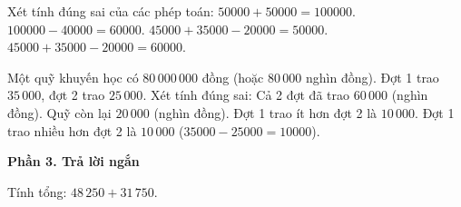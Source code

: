 \begin{ex} %
Xét tính đúng sai của các phép toán:
\choiceTF
{\True $50000 + 50000 = 100000$.}
{\True $100000 - 40000 = 60000$.}
{$45000 + 35000 - 20000 = 50000$.}
{\True $45000 + 35000 - 20000 = 60000$.}
\end{ex}

\begin{ex} %
Một quỹ khuyến học có $80\,000\,000$ đồng (hoặc $80\,000$ nghìn đồng). Đợt 1 trao $35\,000$, đợt 2 trao $25\,000$. Xét tính đúng sai:
\choiceTF
{\True Cả 2 đợt đã trao $60\,000$ (nghìn đồng).}
{\True Quỹ còn lại $20\,000$ (nghìn đồng).}
{Đợt 1 trao ít hơn đợt 2 là $10\,000$.}
{\True Đợt 1 trao nhiều hơn đợt 2 là $10\,000$ ($35000 - 25000 = 10000$).}
\end{ex}

\textbf{Phần 3. Trả lời ngắn}

\begin{ex} %
Tính tổng: $48\,250 + 31\,750$.
\end{ex}

